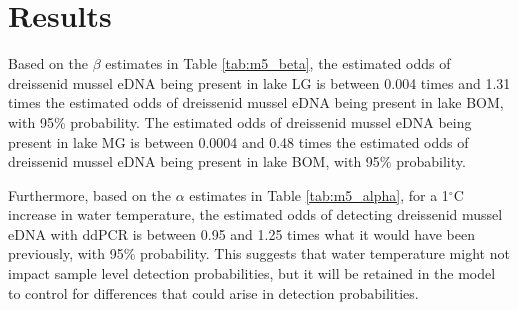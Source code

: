 \documentclass[12pt]{article}\usepackage[]{graphicx}\usepackage[]{color}
\begin{document}
\section{Results}

Based on the $\beta$ estimates in Table \ref{tab:m5_beta}, the estimated odds of dreissenid mussel eDNA being present in lake LG is between 0.004 times and 1.31 times the estimated odds of dreissenid mussel eDNA being present in lake BOM, with 95\% probability. The estimated odds of dreissenid mussel eDNA being present in lake MG is between 0.0004 and 0.48 times the estimated odds of dreissenid mussel eDNA being present in lake BOM, with 95\% probability. 



\begin{table}[!h]
\caption{\label{tab:m5_beta}
             Summary table of the $\hat \beta$ coefficients for $logit(\hat \psi_i) = \hat \beta_0 + 
             \hat \beta_1I_{lake = LG, i} + \hat \beta_2I_{lake = MG, i}$.}
\small
{}
\end{table}

Furthermore, based on the $\alpha$ estimates in Table \ref{tab:m5_alpha}, for a 1$^\circ$C increase in water temperature, the estimated odds of detecting dreissenid mussel eDNA with ddPCR is between 0.95 and 1.25 times what it would have been previously, with 95\% probability. This suggests that water temperature might not impact sample level detection probabilities, but it will be retained in the model to control for differences that could arise in detection probabilities. 
\end{document}

